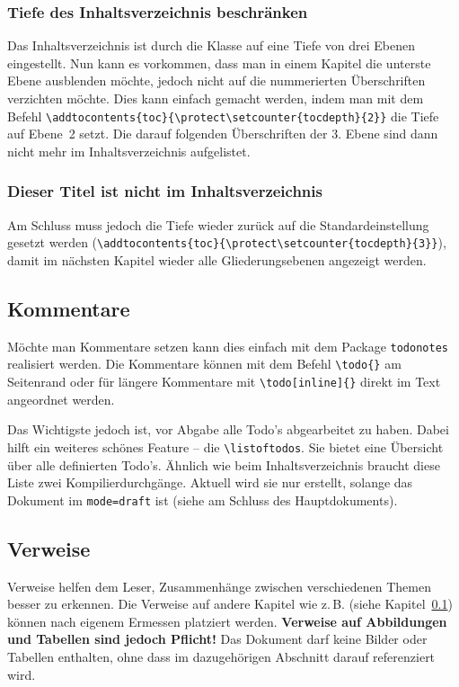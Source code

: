 \subsubsection{Tiefe des Inhaltsverzeichnis beschränken}
Das Inhaltsverzeichnis ist durch die Klasse auf eine Tiefe von drei Ebenen eingestellt. Nun kann es vorkommen, dass man in einem Kapitel die unterste Ebene ausblenden möchte, jedoch nicht auf die nummerierten Überschriften verzichten möchte.
Dies kann einfach gemacht werden, indem man mit dem Befehl \verb|\addtocontents{toc}{\protect\setcounter{tocdepth}{2}}| die Tiefe auf Ebene~2 setzt. Die darauf folgenden Überschriften der 3. Ebene sind dann nicht mehr im Inhaltsverzeichnis aufgelistet. 


\subsubsection{Dieser Titel ist nicht im Inhaltsverzeichnis}
Am Schluss muss jedoch die Tiefe wieder zurück auf die Standardeinstellung gesetzt werden (\verb|\addtocontents{toc}{\protect\setcounter{tocdepth}{3}}|), damit im nächsten Kapitel wieder alle Gliederungsebenen angezeigt werden.


\subsection{Kommentare}\label{sec:todos}
Möchte man Kommentare setzen kann dies einfach mit dem Package \texttt{todonotes} realisiert werden. Die Kommentare können mit dem Befehl \verb|\todo{}| am Seitenrand oder für längere Kommentare mit \verb|\todo[inline]{}| direkt im Text angeordnet werden. 

Das Wichtigste jedoch ist, vor Abgabe alle Todo's abgearbeitet zu haben. Dabei hilft ein weiteres schönes Feature -- die \verb|\listoftodos|. Sie bietet eine Übersicht über alle definierten Todo’s. Ähnlich wie beim Inhaltsverzeichnis braucht diese Liste zwei Kompilierdurchgänge. Aktuell wird sie nur erstellt, solange das Dokument im \texttt{mode=draft} ist (siehe am Schluss des Hauptdokuments).

\subsection{Verweise}
Verweise helfen dem Leser, Zusammenhänge zwischen verschiedenen Themen besser zu erkennen. Die Verweise auf andere Kapitel wie z.\,B. (siehe Kapitel~\ref{sec:todos}) können nach eigenem Ermessen platziert werden. \textbf{Verweise auf Abbildungen und Tabellen sind jedoch Pflicht!} Das Dokument darf keine Bilder oder Tabellen enthalten, ohne dass im dazugehörigen Abschnitt darauf referenziert wird.


